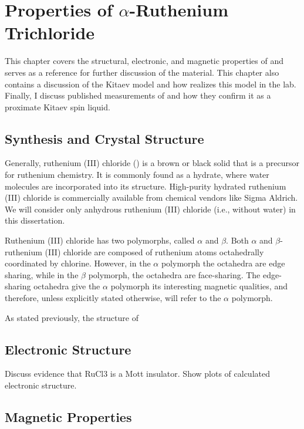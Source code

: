 \chapter{Properties of \texorpdfstring{$\alpha$-Ruthenium Trichloride}{alpha-RuCl3}}
This chapter covers the structural, electronic, and magnetic properties of \rucl and serves as a reference for further discussion of the material. This chapter also contains a discussion of the Kitaev model and how \rucl realizes this model in the lab. Finally, I discuss published measurements of \rucl and how they confirm it as a proximate Kitaev spin liquid.

\section{Synthesis and Crystal Structure}

Generally, ruthenium (III) chloride (\rucl) is a brown or black solid that is a precursor for 	ruthenium chemistry. It is commonly found as a hydrate, where water molecules are incorporated into its structure. High-purity hydrated ruthenium (III) chloride is commercially available from chemical vendors like Sigma Aldrich. We will consider only anhydrous ruthenium (III) chloride (i.e., without water) in this dissertation.

Ruthenium (III) chloride has two polymorphs, called $\alpha$ and $\beta$. Both $\alpha$ and $\beta$-ruthenium (III) chloride are composed of ruthenium atoms octahedrally coordinated by chlorine. However, in the $\alpha$ polymorph the octahedra are edge sharing, while in the $\beta$ polymorph, the octahedra are face-sharing. The edge-sharing octahedra give the $\alpha$ polymorph its interesting magnetic qualities, and therefore, unless explicitly stated otherwise, \rucl will refer to the $\alpha$ polymorph.

As stated previously, the structure of \rucl 



\section{Electronic Structure}

Discuss evidence that RuCl3 is a Mott insulator. Show plots of calculated electronic structure.

\section{Magnetic Properties}

